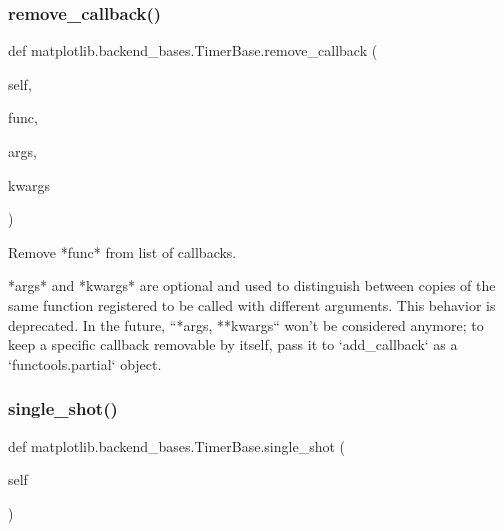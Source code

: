 \mbox{\label{classmatplotlib_1_1backend__bases_1_1TimerBase_ab3ec2638a4c890bd7230005891ddefdd}} 
\subsubsection{\texorpdfstring{remove\+\_\+callback()}{remove\_callback()}}
{\footnotesize\ttfamily def matplotlib.\+backend\+\_\+bases.\+Timer\+Base.\+remove\+\_\+callback (\begin{DoxyParamCaption}\item[{}]{self,  }\item[{}]{func,  }\item[{}]{args,  }\item[{}]{kwargs }\end{DoxyParamCaption})}

\begin{DoxyVerb}Remove *func* from list of callbacks.

*args* and *kwargs* are optional and used to distinguish between copies
of the same function registered to be called with different arguments.
This behavior is deprecated.  In the future, ``*args, **kwargs`` won't
be considered anymore; to keep a specific callback removable by itself,
pass it to `add_callback` as a `functools.partial` object.
\end{DoxyVerb}
 \mbox{\label{classmatplotlib_1_1backend__bases_1_1TimerBase_a1dc74a3c8b17800cbced995985c0635b}} 
\subsubsection{\texorpdfstring{single\+\_\+shot()}{single\_shot()}\hspace{0.1cm}{\footnotesize\ttfamily [1/2]}}
{\footnotesize\ttfamily def matplotlib.\+backend\+\_\+bases.\+Timer\+Base.\+single\+\_\+shot (\begin{DoxyParamCaption}\item[{}]{self }\end{DoxyParamCaption})}

